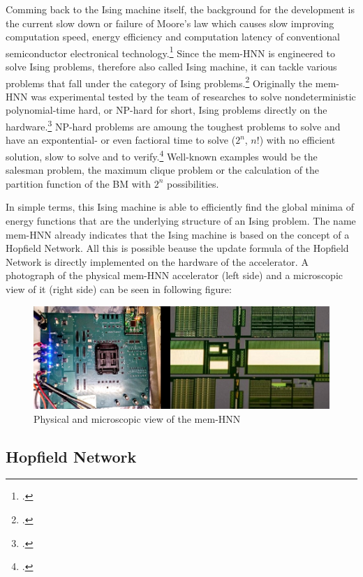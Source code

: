 Comming back to the Ising machine itself, the background for the development is the current slow down or failure of Moore's law which causes slow improving computation speed, energy efficiency and computation latency of conventional semiconductor electronical technology.\footcite[cf.][1]{caiHarnessingIntrinsicNoise2019}
Since the \ac{mem-HNN} is engineered to solve Ising problems, therefore also called Ising machine, it can tackle various problems that fall under the category of Ising problems.\footcite[cf.][363]{mohseniIsingMachinesHardware2022a}
Originally the mem-HNN was experimental tested by the team of researches to solve nondeterministic polynomial-time hard, or NP-hard for short, Ising problems directly on the hardware.\footcite[cf.][410]{caiPowerefficientCombinatorialOptimization2020}
NP-hard problems are amoung the toughest problems to solve and have an expontential- or even factioral time to solve (\( 2^{n} \), \( n{!} \)) with no efficient solution, slow to solve and to verify.\footcite[cf.][497-500]{izadkhahNPNPCompleteNPHard2022}
Well-known examples would be the salesman problem, the maximum clique problem or the calculation of the partition function of the \ac{BM} with \( 2^{n} \) possibilities.

In simple terms, this Ising machine is able to efficiently find the global minima of energy functions that are the underlying structure of an Ising problem. 
The name \ac{mem-HNN} already indicates that the Ising machine is based on the concept of a Hopfield Network.
All this is possible beause the update formula of the Hopfield Network is directly implemented on the hardware of the accelerator.
A photograph of the physical \ac{mem-HNN} accelerator (left side) and a microscopic view of it (right side) can be seen in following figure: 
\begin{figure}[H]
    \centering
    \includegraphics[width=0.65\linewidth]{graphics/Bilder_physische_beschleuniger.jpg}
    \caption{Physical and microscopic view of the mem-HNN}
\end{figure}
\subsection{Hopfield Network}

